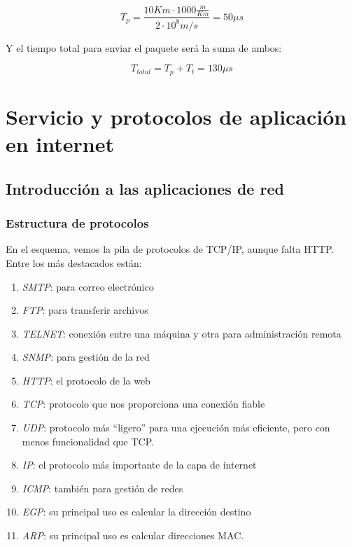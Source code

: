 \documentclass[10pt,a4paper,spanish]{report}
\begin{document}
\begin{displaymath}
  T_p = \frac{10 Km \cdot 1000 \frac{m}{Km}}{2 \cdot 10^8 m/s} = 50 \mu s
\end{displaymath}

Y el tiempo total para enviar el paquete será la suma de ambos:

\begin{displaymath}
  T_{total} = T_p + T_t = 130 \mu s
\end{displaymath}

\chapter{\textcolor{tema2}{Servicio y protocolos de aplicación en internet}}

\section{\textcolor{tema2}Introducción a las aplicaciones de red}
\subsection{\textcolor{tema2}Estructura de protocolos}


En el esquema, vemos la pila de protocolos de TCP/IP, aunque falta HTTP. Entre los más destacados están:
\begin{enumerate}[\color{tema2}{$\longrightarrow$}]
  \item \textit{\textcolor{tema2}{SMTP}}: para correo electrónico
  \item \textit{\textcolor{tema2}{FTP}}: para transferir archivos
  \item \textit{\textcolor{tema2}{TELNET}}: conexión entre una máquina y otra para administración remota
  \item\label{protocolosnmp} \textit{\textcolor{tema2}{SNMP}}: para gestión de la red
  \item \textit{\textcolor{tema2}{HTTP}}: el protocolo de la web
  \item \textit{\textcolor{tema2}{TCP}}: protocolo que nos proporciona una conexión fiable
  \item \textit{\textcolor{tema2}{UDP}}: protocolo más ``ligero'' para una ejecución más eficiente, pero con menos funcionalidad que TCP.
  \item \textit{\textcolor{tema2}{IP}}: el protocolo más importante de la capa de internet
  \item \textit{\textcolor{tema2}{ICMP}}: también para gestión de redes
  \item \textit{\textcolor{tema2}{EGP}}: su principal uso es calcular la dirección destino
  \item \textit{\textcolor{tema2}{ARP}}: su principal uso es calcular direcciones MAC.
\end{enumerate}
\end{document}
